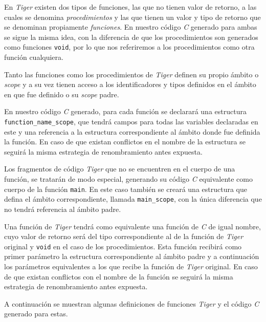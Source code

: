 \documentclass{article}
\begin{document}
En \textit{Tiger} existen dos tipos de funciones, las que no tienen valor de
retorno, a las cuales se denomina \textit{procedimientos} y las que tienen un
valor y tipo de retorno que se denominan propiamente \textit{funciones}. En
nuestro código \textit{C} generado para ambas se sigue la misma idea, con la
diferencia de que los procedimientos son generados como funciones
\texttt{void}, por lo que nos referiremos a los procedimientos como otra
función cualquiera.

Tanto las funciones como los procedimientos de \textit{Tiger} definen su propio
ámbito o \textit{scope} y a su vez tienen acceso a los identificadores y tipos
definidos en el ámbito en que fue definido o su \textit{scope} padre.

En nuestro código \textit{C} generado, para cada función se declarará una
estructura \texttt{function\_name\_scope}, que tendrá campos para todas las
variables declaradas en este y una referencia a la estructura correspondiente
al ámbito donde fue definida la función. En caso de que existan conflictos en
el nombre de la estructura se seguirá la misma estrategia de renombramiento
antes expuesta.

Los fragmentos de código \textit{Tiger} que no se encuentren en el
cuerpo de una función, se tratarán de modo especial, generando su
código \textit{C} equivalente como cuerpo de la función \texttt{main}. En este
caso también se creará una estructura que defina el ámbito correspondiente,
llamada \texttt{main\_scope}, con la única diferencia que no tendrá referencia
al ámbito padre.

Una función de \textit{Tiger} tendrá como equivalente una función de \textit{C}
de igual nombre, cuyo valor de retorno será del tipo correspondiente al de la
función de \textit{Tiger} original y \texttt{void} en el caso de los
procedimientos. Esta función recibirá como primer parámetro la estructura
correspondiente al ámbito padre y a continuación los parámetros equivalentes a
los que recibe la función de \textit{Tiger} original. En caso de que existan
conflictos con el nombre de la función se seguirá la misma estrategia de
renombramiento antes expuesta.

A continuación se muestran algunas definiciones de funciones \emph{Tiger} y el
código \emph{C} generado para estas.
\end{document}
